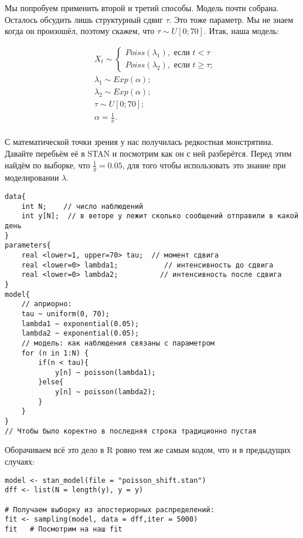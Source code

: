 Мы попробуем применить второй и третий способы. Модель почти собрана. Осталось обсудить лишь структурный сдвиг $\tau$. Это тоже параметр. Мы не знаем когда он произошёл, поэтому скажем, что $\tau \sim U[0;70]$. Итак, наша модель: 

\begin{equation*}
\begin{aligned}
&X_t \sim \begin{cases}  Poiss(\lambda_1), \text{ если } t < \tau \\  Poiss(\lambda_2), \text{ если } t \ge \tau; \end{cases}\\
&\lambda_1 \sim Exp(\alpha); \\
&\lambda_2 \sim Exp(\alpha); \\
&\tau \sim U[0;70]; \\ 
&\alpha = \frac{1}{\bar x}.\\
\end{aligned}
\end{equation*}

С математической точки зрения у нас получилась редкостная монстрятина. Давайте перебьём её в STAN и посмотрим как он с ней разберётся.  Перед этим найдём по выборке, что $\frac{1}{\bar y} = 0.05$, для того чтобы использовать это знание при моделировании $\lambda$. 

\begin{verbatim}
data{
    int N;    // число наблюдений
    int y[N];  // в веторе y лежит сколько сообщений отправили в какой день
}
parameters{
    real <lower=1, upper=70> tau;  // момент сдвига
    real <lower=0> lambda1;           // интенсивность до сдвига
    real <lower=0> lambda2;          // интенсивность после сдвига
}
model{
    // априорно:
    tau ~ uniform(0, 70); 
    lambda1 ~ exponential(0.05);
    lambda2 ~ exponential(0.05);
    // модель: как наблюдения связаны с параметром
    for (n in 1:N) {
        if(n < tau){
            y[n] ~ poisson(lambda1); 
        }else{
            y[n] ~ poisson(lambda2); 
        }
    }
}
// Чтобы было коректно в последняя строка традиционно пустая
\end{verbatim}


Оборачиваем всё это дело в R ровно тем же самым кодом, что и в предыдущих случаях: 

\begin{verbatim}
model <- stan_model(file = "poisson_shift.stan")
dff <- list(N = length(y), y = y)

# Получаем выборку из апостериорных распределений:
fit <- sampling(model, data = dff,iter = 5000)
fit   # Посмотрим на наш fit 
\end{verbatim}

